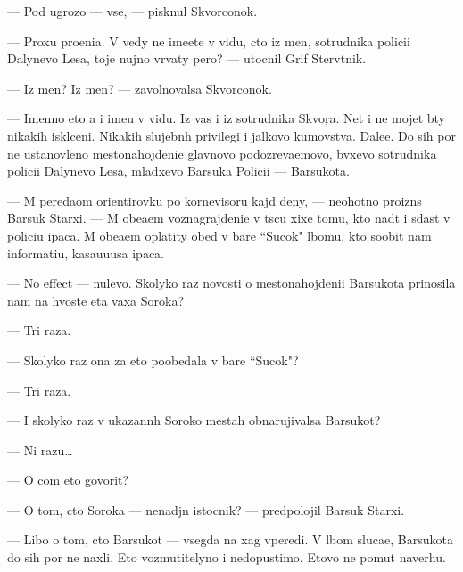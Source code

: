 \documentclass[12pt]{book}
\begin{document}
— Pod ugrozo{\y} — vse, — pisknul Skvorconok.

— Proxu pro{\x}eni{\y}a. V{\yi} vedy ne ime{\y}ete v vidu, cto iz men{\ia}, sotrudnika polici{\y}i Dalynevo Lesa, toje nujno v{\yi}rvaty pero? — utocnil Grif Sterv{\ia}tnik.

— Iz men{\ia}? Iz men{\ia}? — zavolnovalsa Skvorconok.

— Imenno eto {\y}a i ime{\y}u v vidu. Iz vas i iz sotrudnika Skvor{\c}a. Net i ne mojet b{\yi}ty nikakih iskl{\iu}ceni{\y}. Nikakih slujebn{\yi}h privilegi{\y} i jalkovo kumovstva. Dale{\y}e. Do sih por ne ustanovleno mestonahojdeni{\y}e glavnovo podozreva{\y}emovo, b{\yi}vxevo sotrudnika polici{\y}i Dalynevo Lesa, mladxevo Barsuka Polici{\y}i — Barsukota.

— M{\yi} pereda{\y}om orientirovku po kornevisoru kajd{\yi}{\y} deny, — neohotno proizn{\e}s Barsuk Starxi{\y}. — M{\yi} obe{\x}a{\y}em voznagrajdeni{\y}e v t{\yi}s{\ia}cu xixe{\y} tomu, kto na{\y}d{\e}t i sdast v polici{\y}u {\X}ipaca. M{\yi} obe{\x}a{\y}em oplatity obed v bare ``Sucok" l{\iu}bomu, kto soob{\x}it nam informati{\y}u, kasa{\y}u{\x}u{\y}usa {\X}ipaca.

— No effect — nulevo{\y}. Skolyko raz novosti o mestonahojdeni{\y}i Barsukota prinosila nam na hvoste eta vaxa Soroka?

— Tri raza.

— Skolyko raz ona za eto poobedala v bare ``Sucok"?

— Tri raza.

— I skolyko raz v ukazann{\yi}h Soroko{\y} mestah obnarujivalsa Barsukot?

— Ni razu…

— O com eto govorit?

— O tom, cto Soroka — nenad{\e}jn{\yi}{\y} istocnik? — predpolojil Barsuk Starxi{\y}.

— Libo o tom, cto Barsukot — vsegda na xag vperedi. V l{\iu}bom sluca{\y}e, Barsukota do sih por ne naxli. Eto vozmutitelyno i nedopustimo. Etovo ne po{\y}mut naverhu. 
\end{document}
